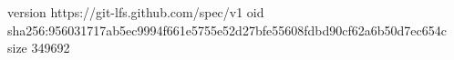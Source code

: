 version https://git-lfs.github.com/spec/v1
oid sha256:956031717ab5ec9994f661e5755e52d27bfe55608fdbd90cf62a6b50d7ec654c
size 349692
